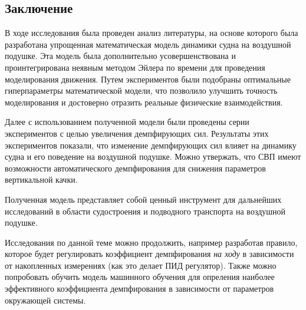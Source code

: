 \begin{centering}
    \section*{Заключение}
\end{centering}
\setcounter{section}{1}

В ходе исследования была проведен анализ литературы, на основе которого была разработана упрощенная математическая модель динамики судна на воздушной подушке. Эта модель была дополнительно усовершенствована и проинтегрирована неявным методом Эйлера по времени для проведения моделирования движения. Путем экспериментов были подобраны оптимальные гиперпараметры математической модели, что позволило улучшить точность моделирования и достоверно отразить реальные физические взаимодействия.

Далее с использованием полученной модели были проведены серии экспериментов с целью увеличения демпфирующих сил. Результаты этих экспериментов показали, что изменение демпфирующих сил влияет на динамику судна и его поведение на воздушной подушке. Можно утвержать, что СВП имеют возможности автоматического демпфирования для снижения параметров вертикальной качки.

Полученная модель представляет собой ценный инструмент для дальнейших исследований в области судостроения и подводного транспорта на воздушной подушке.

Исследования по данной теме можно продолжить, например разработав правило, которое будет регулировать коэффициент демпфирования {\it на ходу} в зависимости от накопленных измерениях (как это делает ПИД регулятор). Также можно попробовать обучить модель машинного обучения для опреления наиболее эффективного коэффициента демпфирования в зависимости от параметров окружающей системы. 